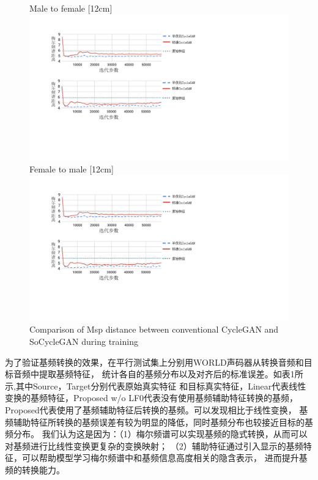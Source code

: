 \begin{figure}[!hbtp]
    \centering
                    {Male to female}%
                    [12cm]{\includegraphics[width=12cm,trim=50 320 350 50,clip]{figure/4_msd.png}} \\
    \vspace{0.5cm}
                    {Female to male}%
                    [12cm]{\includegraphics[width=12cm,trim=50 150 350 230,clip]{figure/4_msd.png}}
              {Comparison of Msp distance between conventional CycleGAN and SoCycleGAN during training}
    \label{fig:msd}
  \end{figure}

为了验证基频转换的效果，在平行测试集上分别用WORLD声码器从转换音频和目标音频中提取基频特征，
统计各自的基频分布以及对齐后的标准误差。如表1所示,其中Source，Target分别代表原始真实特征
和目标真实特征，Linear代表线性变换的基频特征，Proposed w/o LF0代表没有使用基频辅助特征转换的基频，
Proposed代表使用了基频辅助特征后转换的基频。可以发现相比于线性变换，
基频辅助特征所转换的基频误差有较为明显的降低，同时基频分布也较接近目标的基频分布。
我们认为这是因为：（1）梅尔频谱可以实现基频的隐式转换，从而可以对基频进行比线性变换更复杂的变换映射；
（2）辅助特征通过引入显示的基频特征，可以帮助模型学习梅尔频谱中和基频信息高度相关的隐含表示，
进而提升基频的转换能力。

